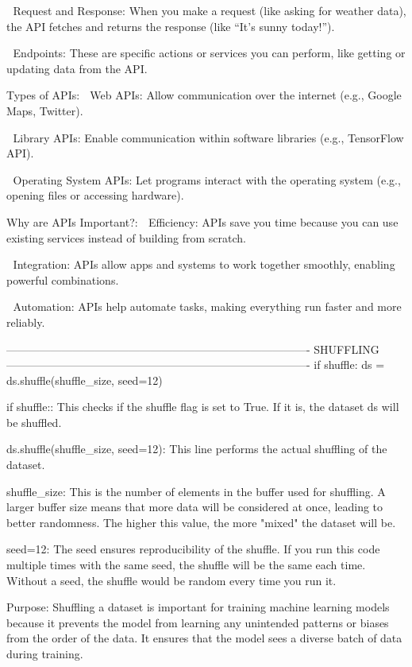 🔷 Request and Response:
When you make a request (like asking for weather data), the API fetches and returns the response (like “It’s sunny today!”).

🔷 Endpoints:
These are specific actions or services you can perform, like getting or updating data from the API.

Types of APIs:
🔷 Web APIs:
Allow communication over the internet (e.g., Google Maps, Twitter).

🔷 Library APIs:
Enable communication within software libraries (e.g., TensorFlow API).

🔷 Operating System APIs:
Let programs interact with the operating system (e.g., opening files or accessing hardware).

Why are APIs Important?:
🔷 Efficiency:
APIs save you time because you can use existing services instead of building from scratch.

🔷 Integration:
APIs allow apps and systems to work together smoothly, enabling powerful combinations.

🔷 Automation:
APIs help automate tasks, making everything run faster and more reliably.

----------------------------------------------------------------------------------
SHUFFLING🔀
----------------------------------------------------------------------------------
if shuffle:
        ds = ds.shuffle(shuffle_size, seed=12)
        
if shuffle::
This checks if the shuffle flag is set to True. If it is, the dataset ds will be shuffled.

ds.shuffle(shuffle_size, seed=12):
This line performs the actual shuffling of the dataset.

shuffle_size:
This is the number of elements in the buffer used for shuffling. A larger buffer size means that more data will be considered at once, leading to better randomness. The higher this value, the more "mixed" the dataset will be.

seed=12:
The seed ensures reproducibility of the shuffle. If you run this code multiple times with the same seed, the shuffle will be the same each time. Without a seed, the shuffle would be random every time you run it.

Purpose:
Shuffling a dataset is important for training machine learning models because it prevents the model from learning any unintended patterns or biases from the order of the data. It ensures that the model sees a diverse batch of data during training.

